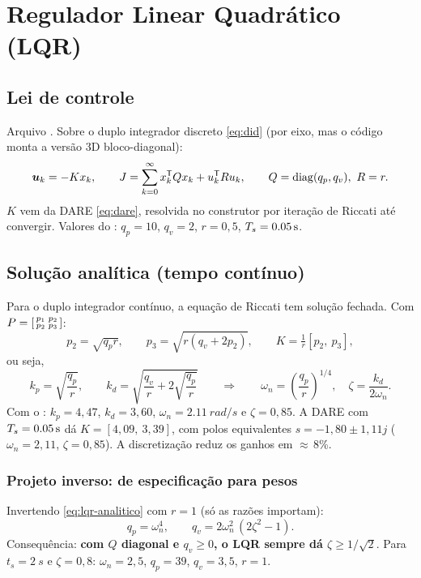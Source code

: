 \chapter{Regulador Linear Quadrático (LQR)}
\label{cap:lqr}

\section{Lei de controle}
Arquivo . Sobre o duplo integrador discreto
\eqref{eq:did} (por eixo, mas o código monta a versão 3D bloco-diagonal):
\begin{equation}
  \bm{u}_k = -K x_k,\qquad
  J=\sum_{k=0}^{\infty} x_k^{\mathsf{T}} Q x_k + u_k^{\mathsf{T}} R u_k,\qquad
  Q=\mathrm{diag}(q_p,q_v),\ R=r .
\end{equation}
$K$ vem da DARE \eqref{eq:dare}, resolvida no construtor por iteração de Riccati até
convergir. Valores do : $q_p=10$, $q_v=2$, $r=0{,}5$, $T_s=\SI{0,05}{s}$.

\section{Solução analítica (tempo contínuo)}
Para o duplo integrador contínuo, a equação de Riccati tem solução fechada. Com
$P=\begin{bsmallmatrix}p_1&p_2\\p_2&p_3\end{bsmallmatrix}$:
\begin{equation}
  p_2 = \sqrt{q_p r},\qquad p_3 = \sqrt{r(q_v + 2p_2)},\qquad
  K = \tfrac1r[p_2,\ p_3],
\end{equation}
ou seja,
\begin{equation}
  \boxed{k_p = \sqrt{\frac{q_p}{r}},\qquad
         k_d = \sqrt{\frac{q_v}{r} + 2\sqrt{\frac{q_p}{r}}}}
  \qquad\Longrightarrow\qquad
  \omega_n = \left(\frac{q_p}{r}\right)^{1/4},\quad
  \zeta = \frac{k_d}{2\omega_n}.
  \label{eq:lqr-analitico}
\end{equation}
Com o : $k_p=4{,}47$, $k_d=3{,}60$, $\omega_n=\SI{2,11}{rad/s}$ e $\zeta=0{,}85$.
A DARE com $T_s=\SI{0,05}{s}$ dá $K=[4{,}09,\ 3{,}39]$, com polos equivalentes
$s=-1{,}80\pm1{,}11j$ ($\omega_n=2{,}11$, $\zeta=0{,}85$). A discretização reduz os
ganhos em $\approx$\,8\%.

\subsection{Projeto inverso: de especificação para pesos}
Invertendo \eqref{eq:lqr-analitico} com $r=1$ (só as razões importam):
\begin{equation}
  q_p = \omega_n^4,\qquad q_v = 2\omega_n^2\,(2\zeta^2 - 1).
\end{equation}
Consequência: \textbf{com $Q$ diagonal e $q_v\ge0$, o LQR sempre dá $\zeta\ge1/\sqrt2$}.
Para $t_s=\SI{2}{s}$ e $\zeta=0{,}8$: $\omega_n=2{,}5$, $q_p=39$, $q_v=3{,}5$, $r=1$.


